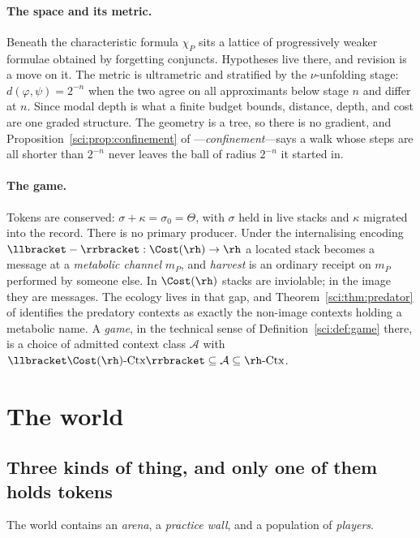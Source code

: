 \paragraph{The space and its metric.} Beneath the characteristic formula
$\chi_P$ sits a lattice of progressively weaker formulae obtained by forgetting
conjuncts. Hypotheses live there, and revision is a move on it. The metric is
ultrametric and stratified by the $\nu$-unfolding stage: $d(\varphi,\psi) =
2^{-n}$ when the two agree on all approximants below stage $n$ and differ at
$n$. Since modal depth is what a finite budget bounds, distance, depth, and cost
are one graded structure. The geometry is a tree, so there is no gradient, and
Proposition~\ref{sci:prop:confinement} of \chSci---\emph{confinement}---says a walk whose
steps are all shorter than $2^{-n}$ never leaves the ball of radius $2^{-n}$ it
started in.

\paragraph{The game.} Tokens are conserved: $\sigma + \kappa = \sigma_0 =
\Theta$, with $\sigma$ held in live stacks and $\kappa$ migrated into the
record. There is no primary producer. Under the internalising encoding
$\llbracket -\rrbracket : \Cost(\rh) \to \rh$ a located stack becomes a message
at a \emph{metabolic channel} $m_P$, and \emph{harvest} is an ordinary receipt
on $m_P$ performed by someone else. In $\Cost(\rh)$ stacks are inviolable; in
the image they are messages. The ecology lives in that gap, and Theorem~\ref{sci:thm:predator} of
\chSci identifies the predatory contexts as exactly the non-image
contexts holding a metabolic name. A \emph{game}, in the technical sense of
Definition~\ref{sci:def:game} there, is a choice of admitted context class $\mathcal{A}$ with
$\llbracket \Cost(\rh)\text{-Ctx}\rrbracket \subseteq \mathcal{A} \subseteq
\rh\text{-Ctx}$.

\section{The world}\label{gam:sec:world}\label{gam:S3}

\subsection{Three kinds of thing, and only one of them holds tokens}\label{gam:S3.1}

The world contains an \emph{arena}, a \emph{practice wall}, and a population of
\emph{players}.

